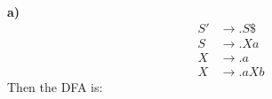 \documentclass[a4paper]{exam}
\begin{document}
\begin{solution}\\
\textbf{a)}\\
    \begin{equation}
        \begin{aligned}
            S' &\rightarrow .S\$ \\
            S &\rightarrow .Xa \\
            X &\rightarrow .a \\ 
            X &\rightarrow .aXb
        \end{aligned}
    \end{equation}
    Then the DFA is: \\
    \begin{tikzpicture}[x=0.75pt,y=0.75pt,yscale=-1,xscale=1]
        

\end{tikzpicture}
\end{solution}
\end{document}
